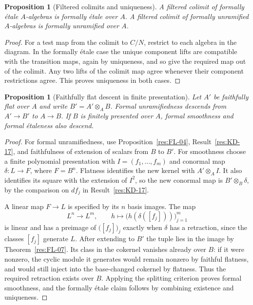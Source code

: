 \documentclass[11pt,oneside,openany]{book}
\newtheorem{proposition}[theorem]{Proposition}
\theoremstyle{definition}
\theoremstyle{remark}
\begin{document}
\begin{proposition}[Filtered colimits and uniqueness]\label{res:FL-16}
A filtered colimit of formally \'{e}tale $A$-algebras is formally
\'{e}tale over $A$. A filtered colimit of formally unramified $A$-algebras
is formally unramified over $A$.
\end{proposition}
\begin{proof}
For a test map from the colimit to $C/N$, restrict to each algebra in the
diagram. In the formally \'{e}tale case the unique component lifts are
compatible with the transition maps, again by uniqueness, and so give
the required map out of the colimit. Any two lifts of the colimit map
agree whenever their component restrictions agree. This proves uniqueness
in both cases.
\end{proof}

\begin{proposition}[Faithfully flat descent in finite presentation]
\label{res:FL-17}
Let $A'$ be faithfully flat over $A$ and write $B'=A'\otimes_A B$.
Formal unramifiedness descends from $A'\to B'$ to $A\to B$. If $B$ is
finitely presented over $A$, formal smoothness and formal \'{e}taleness
also descend.
\end{proposition}
\begin{proof}
For formal unramifiedness, use Proposition~\ref{res:FL-04},
Result~\ref{res:KD-17}, and faithfulness of extension of scalars from
$B$ to $B'$. For smoothness choose a finite polynomial presentation with
$I=(f_1,\ldots,f_m)$ and conormal map $\delta:L\to F$, where $F=B^n$.
Flatness identifies the new kernel with $A'\otimes_A I$. It also identifies
its square with the extension of $I^2$, so the new conormal map is
$B'\otimes_B\delta$, by the comparison on $df_j$ in Result~\ref{res:KD-17}.

A linear map $F\to L$ is specified by its $n$ basis images. The map
\[
  L^n\longrightarrow L^m,\qquad
  h\longmapsto\bigl(h(\delta([f_j]))\bigr)_{j=1}^m
\]
is linear and has a preimage of $\bigl([f_j]\bigr)_j$ exactly when
$\delta$ has a retraction, since the classes $[f_j]$ generate $L$.
After extending to $B'$ the tuple lies in the image by
Theorem~\ref{res:FL-07}. Its class in the cokernel vanishes already over $B$:
if it were nonzero, the cyclic module it generates would remain nonzero by
faithful flatness, and would still inject into the base-changed cokernel by
flatness. Thus the required retraction exists over $B$. Applying the
splitting criterion proves formal smoothness, and the formally \'{e}tale
claim follows by combining existence and uniqueness.
\end{proof}
\end{document}
